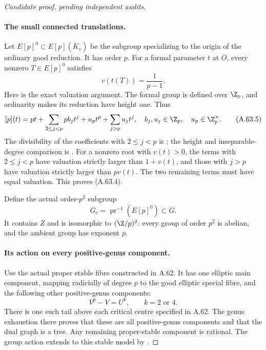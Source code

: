 \begin{proof}[Candidate proof, pending independent audits]
\paragraph{The small connected translations.}
Let \(E[p]^0\subset E[p](\overline K_v)\) be the subgroup
specializing to the origin of the ordinary good reduction.
It has order \(p\). For a formal parameter \(t\) at \(O\),
every nonzero \(T\in E[p]^0\) satisfies
\[
                         v(t(T))=\frac1{p-1}.           \tag{A.63.4}
\]
Here is the exact valuation argument. The formal group is
defined over \(\Z_p\), and ordinarity makes its reduction
have height one. Thus
\[
 [p](t)=pt+\sum_{2\le j<p}p b_jt^j+u_pt^p
                       +\sum_{j>p}u_jt^j,
 \quad b_j,u_j\in\Z_p,\quad u_p\in\Z_p^\times.
                                                        \tag{A.63.5}
\]
The divisibility of the coefficients with \(2\le j<p\)
is \cite[Corollary IV.4.4, p.126]{fghSilvermanAEC};
the height and inseparable-degree comparison is
\cite[Theorem IV.7.4, p.134]{fghSilvermanAEC}.
For a nonzero root with \(v(t)>0\), the terms with
\(2\le j<p\) have valuation strictly larger than
\(1+v(t)\), and those with \(j>p\) have valuation
strictly larger than \(p v(t)\). The two remaining terms
must have equal valuation. This proves (A.63.4).

Define the actual order-\(p^2\) subgroup
\[
             G_c=\operatorname{pr}^{-1}(E[p]^0)\subset G.
                                                        \tag{A.63.6}
\]
It contains \(Z\) and is isomorphic to
\((\Z/p)^2\): every group of order \(p^2\) is abelian,
and the ambient group has exponent \(p\).

\paragraph{Its action on every positive-genus component.}
Use the actual proper stable fibre constructed in A.62.
It has one elliptic main component, mapping radicially of
degree \(p\) to the good elliptic special fibre, and the
following other positive-genus components:
\[
 V^p-V=U^k,\qquad k=2\text{ or }4.                       \tag{A.63.7}
\]
There is one such tail above each critical centre specified
in A.62. The genus exhaustion there proves that these are
all positive-genus components and that the dual graph is a
tree. Any remaining proper-stable component is rational.
The group action extends to this stable model by
\cite[Proposition 10.1.16 and Theorem 10.3.34(b),
pp.460--461 and 518--519]{fghLiu}.


\end{proof}
